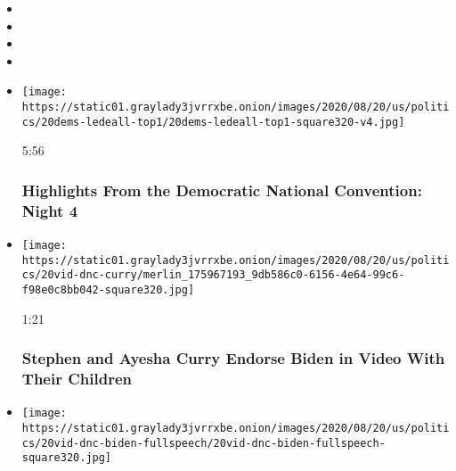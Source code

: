 \begin{itemize}
\item
\item
\item
\item
\end{itemize}

\begin{itemize}
\item
  \href{https://www.nytimes3xbfgragh.onion/video/us/politics/100000007299516/democratic-national-convention-highlights.html?action=click\&module=video-series-bar\&region=header\&pgtype=Article\&playlistId=video/latest-video}{}

  \texttt{[image: https://static01.graylady3jvrrxbe.onion/images/2020/08/20/us/politics/20dems-ledeall-top1/20dems-ledeall-top1-square320-v4.jpg]}

  5:56

  \hypertarget{highlights-from-the-democratic-national-convention-night-4}{%
  \subsubsection{Highlights From the Democratic National Convention:
  Night
  4}\label{highlights-from-the-democratic-national-convention-night-4}}
\item
  \href{https://www.nytimes3xbfgragh.onion/video/us/elections/100000007299782/stephen-curry-speaks-dnc.html?action=click\&module=video-series-bar\&region=header\&pgtype=Article\&playlistId=video/latest-video}{}

  \texttt{[image: https://static01.graylady3jvrrxbe.onion/images/2020/08/20/us/politics/20vid-dnc-curry/merlin\_175967193\_9db586c0-6156-4e64-99c6-f98e0c8bb042-square320.jpg]}

  1:21

  \hypertarget{stephen-and-ayesha-curry-endorse-biden-in-video-with-their-children}{%
  \subsubsection{Stephen and Ayesha Curry Endorse Biden in Video With
  Their
  Children}\label{stephen-and-ayesha-curry-endorse-biden-in-video-with-their-children}}
\item
  \href{https://www.nytimes3xbfgragh.onion/video/us/elections/100000007299879/joe-biden-full-speech.html?action=click\&module=video-series-bar\&region=header\&pgtype=Article\&playlistId=video/latest-video}{}

  \texttt{[image: https://static01.graylady3jvrrxbe.onion/images/2020/08/20/us/politics/20vid-dnc-biden-fullspeech/20vid-dnc-biden-fullspeech-square320.jpg]}


\end{itemize}
